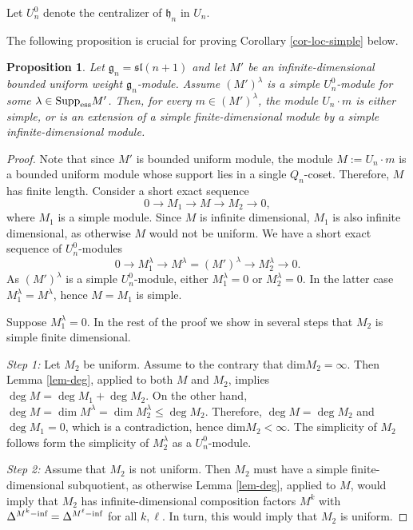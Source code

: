\documentclass[12pt]{amsart}
\def\gg{\mathfrak{g}}
\newtheorem{prop}[thm]{Proposition}
\begin{document}
Let  $U^0_n$ denote the centralizer of $\mathfrak h_{n}$ in $U_n$. 

The following proposition is crucial for proving Corollary \ref{cor-loc-simple} below.
\begin{prop} \label{prop_ext_simple}
Let $\gg_n = \mathfrak{sl}({n+1})$ and let $M'$ be an infinite-dimensional  bounded uniform weight $\gg_n$-module. Assume $(M')^{\lambda}$ is a simple $U^0_n$-module for some $\lambda\in \textup{Supp}_\textup{ess}M'$. Then, for every $m \in (M')^{\lambda}$, the module $U_n\cdot m$ is either  simple, or is an extension of a simple finite-dimensional module by a simple infinite-dimensional  module.
\end{prop}
\begin{proof}
 Note that since $M'$ is bounded uniform  module, the module $M:=U_n\cdot m$ is a bounded uniform module whose support lies in a single $Q_n$-coset. Therefore, $M$ has finite length.  Consider a short exact sequence
$$
0 \to M_1 \to M \to M_2 \to 0,
$$
where $M_1$ is a simple module. Since $M$ is infinite dimensional, $M_1$ is also infinite dimensional, as otherwise $M$ would not be uniform. We have a short exact sequence of $U^0_n$-modules
$$
0 \to M_1^{\lambda} \to M^{\lambda}=(M')^{\lambda}  \to M_2^{\lambda}  \to 0.
$$
As $(M')^{\lambda}$ is a simple $U^0_n$-module, either $M_1^{\lambda} =0$ or $M_2^{\lambda} =0$. In the latter case $M_1^{\lambda} = M^{\lambda} $, hence $M = M_1$ is simple.

 Suppose  $M_1^{\lambda} =0$.  In the rest of the proof we show in several steps that $M_2$ is simple finite dimensional.




{\it Step 1:} Let $M_2$ be uniform. Assume to the contrary that dim$M_2=\infty$. Then Lemma \ref{lem-deg}, applied to both $M$ and $M_2$, implies $\deg M = \deg M_1 + \deg M_2$. On the other hand, $ \deg M = \dim M^{\lambda} = \dim M_2^{\lambda} \leq \deg M_2$. Therefore, $\deg  M = \deg M_2$ and $\deg M_1 = 0$, which is a contradiction, hence dim$M_2<\infty$. The simplicity of $M_2$ follows form the simplicity of $M_2^\lambda$ as a $U^0_n$-module.

{\it Step 2:} Assume  that $M_2$ is not uniform. Then $M_2$ must have a simple finite-dimensional subquotient, as otherwise Lemma \ref{lem-deg}, applied to $M$, would imply that $M_2$ has infinite-dimensional composition factors $M^k$ with $\Delta^{M^{k}-\textup{inf}}=\Delta^{M^{\ell}-\textup{inf}}$ for all $k,\ell$. In turn, this would imply that $M_2$ is uniform.


\end{proof}
\end{document}
